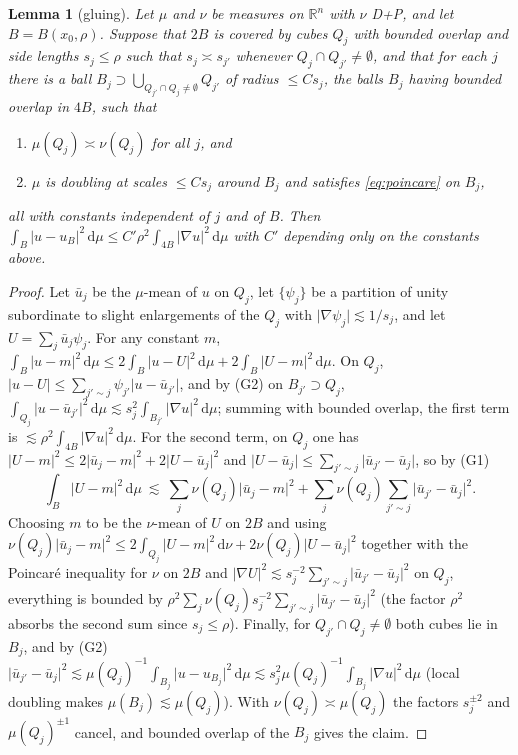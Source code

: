 \documentclass[11pt]{amsart}
\newcommand{\R}{\mathbb{R}}
\newcommand{\dd}{\,\mathrm{d}}
\newcommand{\abs}[1]{\lvert #1\rvert}
\theoremstyle{plain}
\newtheorem{lemma}[theorem]{Lemma}
\theoremstyle{definition}
\theoremstyle{remark}
\begin{document}
\begin{lemma}[gluing]\label{lem:glue}
Let $\mu$ and $\nu$ be measures on $\R^n$ with $\nu$ D+P, and let $B=B(x_0,\rho)$.
Suppose that $2B$ is covered by cubes $Q_j$ with bounded overlap and side
lengths $s_j\le\rho$ such that $s_j\asymp s_{j'}$ whenever $Q_j\cap Q_{j'}\ne
\emptyset$, and that for each $j$ there is a ball $B_j\supset\bigcup_{Q_{j'}\cap
Q_j\ne\emptyset}Q_{j'}$ of radius $\le Cs_j$, the balls $B_j$ having bounded
overlap in $4B$, such that
\begin{enumerate}[label=\textup{(G\arabic*)},leftmargin=2.6em,itemsep=1pt]
\item $\mu(Q_j)\asymp\nu(Q_j)$ for all $j$, and
\item $\mu$ is doubling at scales $\le Cs_j$ around $B_j$ and satisfies
\eqref{eq:poincare} on $B_j$,
\end{enumerate}
all with constants independent of $j$ and of $B$. Then
$\int_B\abs{u-u_B}^2\dd\mu\le C'\rho^2\int_{4B}\abs{\nabla u}^2\dd\mu$ with $C'$
depending only on the constants above.
\end{lemma}

\begin{proof}
Let $\bar u_j$ be the $\mu$-mean of $u$ on $Q_j$, let $\{\psi_j\}$ be a
partition of unity subordinate to slight enlargements of the $Q_j$ with
$\abs{\nabla\psi_j}\lesssim1/s_j$, and let $U=\sum_j\bar u_j\psi_j$. For any
constant $m$, $\int_B\abs{u-m}^2\dd\mu\le2\int_B\abs{u-U}^2\dd\mu+2\int_B\abs{U-m}^2\dd\mu$.
On $Q_j$, $\abs{u-U}\le\sum_{j'\sim j}\psi_{j'}\abs{u-\bar u_{j'}}$, and by (G2)
on $B_{j'}\supset Q_j$,
$\int_{Q_j}\abs{u-\bar u_{j'}}^2\dd\mu\lesssim s_j^2\int_{B_{j'}}\abs{\nabla u}^2\dd\mu$;
summing with bounded overlap, the first term is $\lesssim\rho^2\int_{4B}
\abs{\nabla u}^2\dd\mu$. For the second term, on $Q_j$ one has
$\abs{U-m}^2\le2\abs{\bar u_j-m}^2+2\abs{U-\bar u_j}^2$ and
$\abs{U-\bar u_j}\le\sum_{j'\sim j}\abs{\bar u_{j'}-\bar u_j}$, so by (G1)
\[
\int_B\abs{U-m}^2\dd\mu\ \lesssim\ \sum_j\nu(Q_j)\abs{\bar u_j-m}^2+
\sum_j\nu(Q_j)\sum_{j'\sim j}\abs{\bar u_{j'}-\bar u_j}^2 .
\]
Choosing $m$ to be the $\nu$-mean of $U$ on $2B$ and using
$\nu(Q_j)\abs{\bar u_j-m}^2\le2\int_{Q_j}\abs{U-m}^2\dd\nu+2\nu(Q_j)\abs{U-\bar u_j}^2$
together with the Poincar\'e inequality for $\nu$ on $2B$ and
$\abs{\nabla U}^2\lesssim s_j^{-2}\sum_{j'\sim j}\abs{\bar u_{j'}-\bar u_j}^2$ on
$Q_j$, everything is bounded by
$\rho^2\sum_j\nu(Q_j)s_j^{-2}\sum_{j'\sim j}\abs{\bar u_{j'}-\bar u_j}^2$ (the
factor $\rho^2$ absorbs the second sum since $s_j\le\rho$). Finally, for
$Q_{j'}\cap Q_j\ne\emptyset$ both cubes lie in $B_j$, and by (G2)
$\abs{\bar u_{j'}-\bar u_j}^2\lesssim\mu(Q_j)^{-1}\int_{B_j}\abs{u-u_{B_j}}^2\dd\mu
\lesssim s_j^2\mu(Q_j)^{-1}\int_{B_j}\abs{\nabla u}^2\dd\mu$ (local doubling makes
$\mu(B_j)\lesssim\mu(Q_j)$). With $\nu(Q_j)\asymp\mu(Q_j)$ the factors $s_j^{\pm2}$
and $\mu(Q_j)^{\pm1}$ cancel, and bounded overlap of the $B_j$ gives the claim.
\end{proof}
\end{document}
